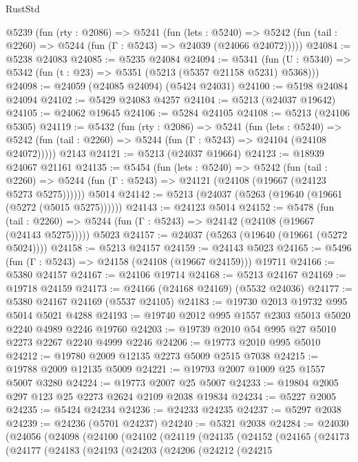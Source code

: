 \begin{lexlean}{RustStd}
\begin{coremodule}
  @5239
    (fun (rty : @2086) =>
    @5241
      (fun (lets : @5240) =>
      @5242 (fun (tail : @2260) => @5244 (fun (Γ : @5243) => @24039 (@24066 @24072)))))
@24084 := @5238 @24083
@24085 := @5235 @24084
@24094 := @5341
    (fun (U : @5340) => @5342 (fun (t : @23) => @5351 (@5213 (@5357 @21158 @5231) @5368)))
@24098 := @24059 (@24085 @24094) (@5424 @24031)
@24100 := @5198 @24084 @24094
@24102 := @5429 @24083 @4257
@24104 := @5213 (@24037 @19642)
@24105 := @24062 @19645
@24106 := @5284 @24105
@24108 := @5213 (@24106 @5305)
@24119 := @5432
    (fun (rty : @2086) =>
    @5241
      (fun (lets : @5240) =>
      @5242 (fun (tail : @2260) => @5244 (fun (Γ : @5243) => @24104 (@24108 @24072)))))
    @2143
@24121 := @5213 (@24037 @19664)
@24123 := @18939 @24067 @21161
@24135 := @5454
    (fun (lets : @5240) =>
    @5242
      (fun (tail : @2260) =>
      @5244 (fun (Γ : @5243) => @24121 (@24108 (@19667 (@24123 @5273 @5275))))))
    @5014
@24142 := @5213 (@24037 (@5263 (@19640 (@19661 (@5272 (@5015 @5275))))))
@24143 := @24123 @5014
@24152 := @5478
    (fun (tail : @2260) => @5244 (fun (Γ : @5243) => @24142 (@24108 (@19667 (@24143 @5275)))))
    @5023
@24157 := @24037 (@5263 (@19640 (@19661 (@5272 @5024))))
@24158 := @5213 @24157
@24159 := @24143 @5023
@24165 := @5496 (fun (Γ : @5243) => @24158 (@24108 (@19667 @24159))) @19711
@24166 := @5380 @24157
@24167 := @24106 @19714
@24168 := @5213 @24167
@24169 := @19718 @24159
@24173 := @24166 (@24168 @24169) (@5532 @24036)
@24177 := @5380 @24167 @24169 (@5537 @24105)
@24183 := @19730 @2013 @19732 @995 @5014 @5021 @4288
@24193 := @19740 @2012 @995 @1557 @2303 @5013 @5020 @2240 @4989 @2246 @19760
@24203 := @19739 @2010 @54 @995 @27 @5010 @2273 @2267 @2240 @4999 @2246
@24206 := @19773 @2010 @995 @5010
@24212 := @19780 @2009 @12135 @2273 @5009 @2515 @7038
@24215 := @19788 @2009 @12135 @5009
@24221 := @19793 @2007 @1009 @25 @1557 @5007 @3280
@24224 := @19773 @2007 @25 @5007
@24233 := @19804 @2005 @297 @123 @25 @2273 @2624 @2109 @2038 @19834
@24234 := @5227 @2005
@24235 := @5424 @24234
@24236 := @24233 @24235
@24237 := @5297 @2038
@24239 := @24236 (@5701 @24237)
@24240 := @5321 @2038
@24284 := @24030
    (@24056
      (@24098
        (@24100
          (@24102
            (@24119
              (@24135
                (@24152
                  (@24165
                    (@24173
                      (@24177
                        (@24183
                          (@24193
                            (@24203
                              (@24206
                                (@24212
                                  (@24215

\end{coremodule}
\end{lexlean}
